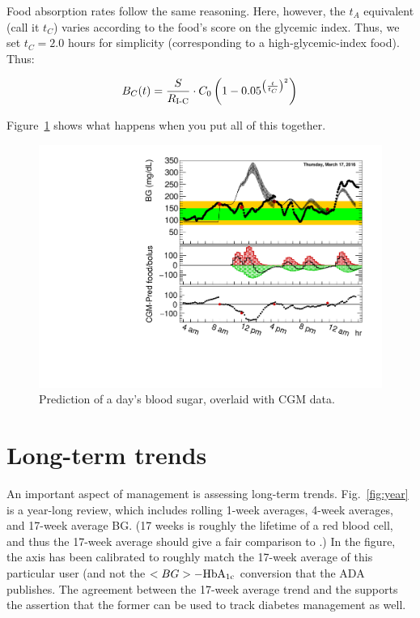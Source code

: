 Food absorption rates follow the same reasoning. Here, however, the $t_A$  equivalent (call it $t_C$) 
varies according to the food's score on the glycemic index. Thus, we set $t_C=2.0$ hours for 
simplicity (corresponding to a high-glycemic-index food). Thus:

\begin{equation}
{B_C}(t) = {S\over R_\text{I-C}}\cdot C_0\left( 1 - 0.05^{\left({t\over{t_C}}\right)^2} \right)
\label{eq:carb}
\end{equation}

Figure~\ref{fig:predictive_daily} shows what happens when you put all of this together.

\begin{figure}[htbp]
\begin{center}
\includegraphics[width=4.5in]{figures/predictive_dailyview.pdf}
\caption{
Prediction of a day's blood sugar, overlaid with CGM data.
}
\label{fig:predictive_daily}
\end{center}
\end{figure}

\section{Long-term trends}

An important aspect of management is assessing long-term trends. Fig.~\ref{fig:year} is a year-long
review, which includes rolling 1-week averages, 4-week averages, and 17-week average BG. (17 weeks is
roughly the lifetime of a red blood cell, and thus the 17-week average should give a fair comparison
to \hbac.) In the figure, the \hbac axis has been calibrated to roughly match the 17-week average of
this particular user (and not the $<BG>-\text{HbA}_\text{1c}$ conversion that the ADA publishes.
The agreement between the 17-week average trend and the \hbac supports the assertion that the former
can be used to track diabetes management as well.

